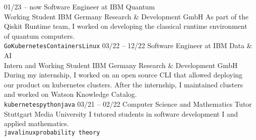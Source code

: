\documentclass[9pt]{developercv} %
\begin{document}
\begin{entrylist}
	\entry
		{01/23 -- now}
		{Software Engineer at IBM Quantum\\\footnotesize{Working Student}}
		{IBM Germany Research \& Development GmbH}
		{As part of the Qiskit Runtime team, I worked on developing the classical runtime environment of quantum computers.
        \\ \texttt{Go}\slashsep\texttt{Kubernetes}\slashsep\texttt{Containers}\slashsep\texttt{Linux}}
	\entry
		{03/22 -- 12/22}
        {Software Engineer at IBM Data \& AI\\\footnotesize{Intern and Working Student}}
        {IBM Germany Research \& Development GmbH}
		{During my internship, I worked on an open source CLI that allowed deploying our product on kubernetes clusters. After the internship, I maintained clusters and worked on Watson Knowledge Catalog. 
		\\ \texttt{kubernetes}\slashsep\texttt{python}\slashsep\texttt{java}}
	\entry
		{03/21 -- 02/22}
        {Computer Science and Mathematics Tutor}
        {Stuttgart Media University}
		{I tutored students in software development I and applied mathematics.
		\\ \texttt{java}\slashsep\texttt{linux}\slashsep\texttt{probability theory}}
\end{entrylist}


\end{document}

